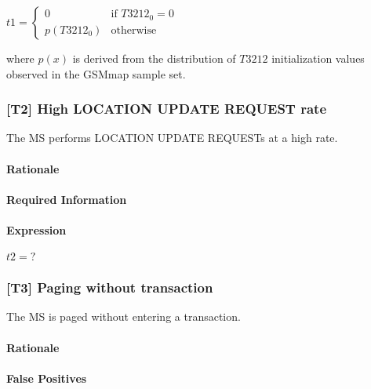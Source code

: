 \documentclass[a4paper,11pt,notitlepage,bigheadings,oneside]{scrartcl}
\begin{document}
$t1 =
\begin{cases}
	0 	 	& \text{if } T3212_0 = 0 \\
	p(T3212_0) 	& \text{otherwise}
\end{cases}$

where $p(x)$ is derived from the distribution of $T3212$ initialization values
observed in the GSMmap sample set.


\subsubsection{[T2] High LOCATION UPDATE REQUEST rate}

The MS performs LOCATION UPDATE REQUESTs at a high rate.

\paragraph{Rationale}


\paragraph{Required Information}


\paragraph{Expression}

$t2 = ?$

\subsubsection{[T3] Paging without transaction}

The MS is paged without entering a transaction.

\paragraph{Rationale}


\paragraph{False Positives}
\end{document}
